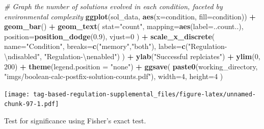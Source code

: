 \documentclass[]{book}
\newenvironment{Shaded}{\begin{snugshade}}{\end{snugshade}}
\newcommand{\CharTok}[1]{\textcolor[rgb]{0.31,0.60,0.02}{#1}}
\newcommand{\CommentTok}[1]{\textcolor[rgb]{0.56,0.35,0.01}{\textit{#1}}}
\newcommand{\DataTypeTok}[1]{\textcolor[rgb]{0.13,0.29,0.53}{#1}}
\newcommand{\DecValTok}[1]{\textcolor[rgb]{0.00,0.00,0.81}{#1}}
\newcommand{\FloatTok}[1]{\textcolor[rgb]{0.00,0.00,0.81}{#1}}
\newcommand{\KeywordTok}[1]{\textcolor[rgb]{0.13,0.29,0.53}{\textbf{#1}}}
\newcommand{\NormalTok}[1]{#1}
\newcommand{\OperatorTok}[1]{\textcolor[rgb]{0.81,0.36,0.00}{\textbf{#1}}}
\newcommand{\StringTok}[1]{\textcolor[rgb]{0.31,0.60,0.02}{#1}}
\begin{document}
\begin{Shaded}
\begin{Highlighting}[]
\CommentTok{# Graph the number of solutions evolved in each condition, faceted by environmental complexity}
\KeywordTok{ggplot}\NormalTok{(sol_data, }\KeywordTok{aes}\NormalTok{(}\DataTypeTok{x=}\NormalTok{condition, }\DataTypeTok{fill=}\NormalTok{condition)) }\OperatorTok{+}
\StringTok{  }\KeywordTok{geom_bar}\NormalTok{() }\OperatorTok{+}
\StringTok{  }\KeywordTok{geom_text}\NormalTok{(}
    \DataTypeTok{stat=}\StringTok{"count"}\NormalTok{,}
    \DataTypeTok{mapping=}\KeywordTok{aes}\NormalTok{(}\DataTypeTok{label=}\NormalTok{..count..),}
    \DataTypeTok{position=}\KeywordTok{position_dodge}\NormalTok{(}\FloatTok{0.9}\NormalTok{),}
    \DataTypeTok{vjust=}\DecValTok{0}
\NormalTok{  ) }\OperatorTok{+}
\StringTok{  }\KeywordTok{scale_x_discrete}\NormalTok{(}
    \DataTypeTok{name=}\StringTok{"Condition"}\NormalTok{,}
    \DataTypeTok{breaks=}\KeywordTok{c}\NormalTok{(}\StringTok{"memory"}\NormalTok{,}\StringTok{"both"}\NormalTok{),}
    \DataTypeTok{labels=}\KeywordTok{c}\NormalTok{(}\StringTok{"Regulation-}\CharTok{\textbackslash{}n}\StringTok{disabled"}\NormalTok{, }\StringTok{"Regulation-}\CharTok{\textbackslash{}n}\StringTok{enabled"}\NormalTok{)}
\NormalTok{  ) }\OperatorTok{+}
\StringTok{  }\KeywordTok{ylab}\NormalTok{(}\StringTok{"Successful replciates"}\NormalTok{) }\OperatorTok{+}
\StringTok{  }\KeywordTok{ylim}\NormalTok{(}\DecValTok{0}\NormalTok{, }\DecValTok{200}\NormalTok{) }\OperatorTok{+}
\StringTok{  }\KeywordTok{theme}\NormalTok{(}\DataTypeTok{legend.position =} \StringTok{"none"}\NormalTok{) }\OperatorTok{+}
\StringTok{  }\KeywordTok{ggsave}\NormalTok{(}
    \KeywordTok{paste0}\NormalTok{(working_directory, }\StringTok{"imgs/boolean-calc-postfix-solution-counts.pdf"}\NormalTok{),}
    \DataTypeTok{width=}\DecValTok{4}\NormalTok{,}
    \DataTypeTok{height=}\DecValTok{4}
\NormalTok{  )}
\end{Highlighting}
\end{Shaded}

\texttt{[image: tag-based-regulation-supplemental\_files/figure-latex/unnamed-chunk-97-1.pdf]}

Test for significance using Fisher's exact test.
\end{document}
